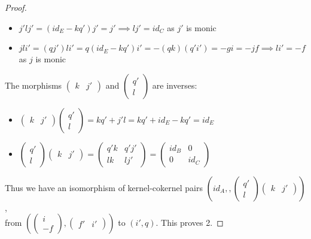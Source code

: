 \documentclass[12pt]{article}
\theoremstyle{definition}
\theoremstyle{remark}
\begin{document}
\begin{proof}
\begin{itemize}
                    \item $j'lj'=(id_E-kq')j'=j'\implies lj'=id_C$ as $j'$ is monic
                    \item $jli'=(qj')li'=q(id_E-kq')i'=-(qk)(q'i')=-gi=-jf \implies li'=-f$ as $j$ is monic
                \end{itemize}
                The morphisms $\begin{pmatrix}
                    k & j'
                \end{pmatrix}$ and $\begin{pmatrix}
                    q' \\ l
                \end{pmatrix}$ are inverses:
                \begin{itemize}
                    \item $\begin{pmatrix}
                        k & j'
                    \end{pmatrix}\begin{pmatrix}
                        q' \\ l
                    \end{pmatrix}=kq'+j'l=kq'+id_E-kq'=id_E$
                    \item $\begin{pmatrix}
                        q' \\ l
                    \end{pmatrix}\begin{pmatrix}
                        k & j'
                    \end{pmatrix}=\begin{pmatrix}
                        q'k & q'j' \\ lk & lj'
                    \end{pmatrix} = \begin{pmatrix}
                        id_B & 0 \\ 0 & id_C
                    \end{pmatrix}$
                \end{itemize}
                Thus we have an isomorphism of kernel-cokernel pairs $(id_A,,\begin{pmatrix}
                    q' \\ l
                \end{pmatrix}\begin{pmatrix}
                    k & j'
                \end{pmatrix})$, \\ from $(\begin{pmatrix}i \\ -f\end{pmatrix},\begin{pmatrix}f' & i'\end{pmatrix})$ to $(i',q)$. This proves 2.
            \end{proof}
\end{document}
